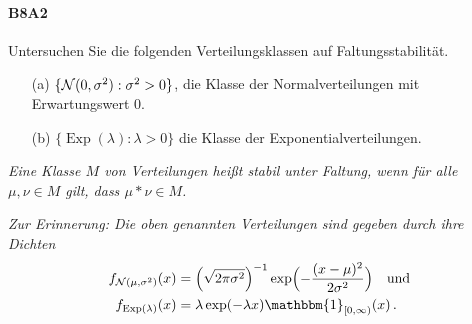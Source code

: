 \documentclass{article}
\begin{document}
\paragraph{B8A2}
Untersuchen Sie die folgenden Verteilungsklassen auf Faltungsstabilität.
\begin{enumerate}
\item[(a)] $\{{\cal N}(0,\sigma^2):\sigma^2>0\}$, die Klasse der Normalverteilungen mit Erwartungswert 0.
\end{enumerate}
\begin{enumerate}
\item[(b)] $\{\operatorname{Exp}(\lambda):\lambda>0\}$ die Klasse der Exponentialverteilungen.
\end{enumerate}
\emph{Eine Klasse $M$ von Verteilungen heißt stabil unter Faltung, wenn für alle $\mu,\nu\in M$ gilt, dass $\mu*\nu\in M$.}
  
\emph{Zur Erinnerung: Die oben genannten Verteilungen sind gegeben durch ihre Dichten}
\begin{align*}
  f_{{\cal N}(\mu,\sigma^2)}(x)&=\Bigl(\sqrt{2\pi\sigma^2}\Bigr)^{-1}\exp\Bigl(-\frac{(x-\mu)^2}{2\sigma^2}\Bigr)\quad\text{und}\\
f_{\operatorname{Exp}(\lambda)}(x)&=\lambda\exp(-\lambda x)\mathbbm{1}_{[0,\infty)}(x)\,.
\end{align*}
\end{document}

